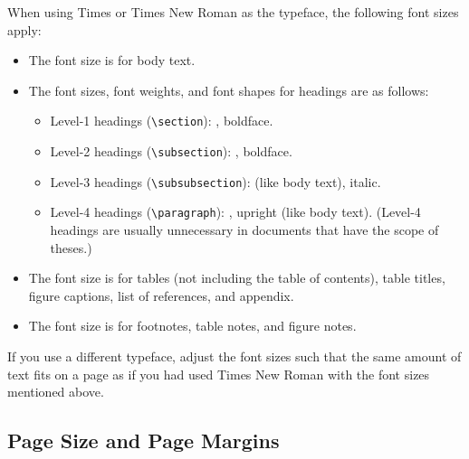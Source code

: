 \documentclass[11pt, a4paper, oneside]{article}
\newlength{\fsLarge}
\newlength{\fslarge}
\newlength{\fsnormal}
\newlength{\fssmall}
\newlength{\fsfootnote}
\theoremstyle{Plain}
\theoremstyle{Definition}
\theoremstyle{Remark}
\begin{document}
When using Times or Times New Roman as the typeface, the following font sizes apply:
\begin{itemize}
	\item The font size is \printlength{\fsnormal} for body text.
	\item The font sizes, font weights, and font shapes for headings are as follows:
		\begin{itemize}
			\item Level-1 headings (\verb|\section|): \printlength{\fsLarge}, boldface.
			\item Level-2 headings (\verb|\subsection|): \printlength{\fslarge}, boldface.
			\item Level-3 headings (\verb|\subsubsection|): \printlength{\fsnormal} (like body text), italic.
			\item Level-4 headings (\verb|\paragraph|): \printlength{\fsnormal}, upright (like body text). (Level-4 headings are usually unnecessary in documents that have the scope of theses.)
		\end{itemize}
	\item The font size is \printlength{\fssmall} for tables (not including the table of contents), table titles, figure captions, list of references, and appendix.
	\item The font size is \printlength{\fsfootnote} for footnotes, table notes, and figure notes.
\end{itemize}

If you use a different typeface, adjust the font sizes such that the same amount of text fits on a page as if you had used Times New Roman with the font sizes mentioned above.

\subsection{Page Size and Page Margins}
\end{document}
